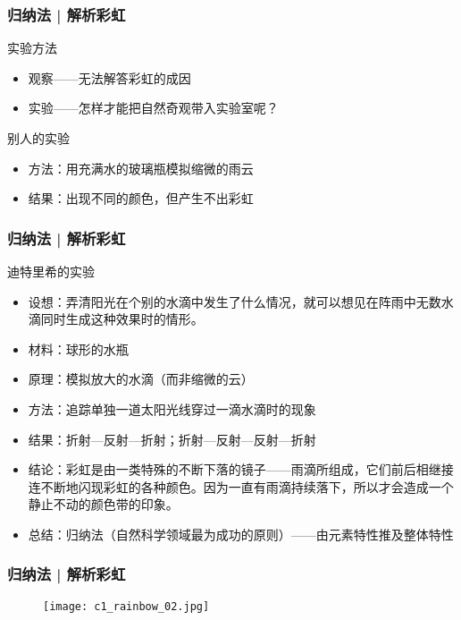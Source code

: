 \begin{frame}
  \frametitle{归纳法 | 解析彩虹}
  \begin{block}{实验方法}
    \begin{itemize}
      \item 观察——无法解答彩虹的成因
      \item 实验——怎样才能把自然奇观带入实验室呢？
    \end{itemize}
  \end{block}
  \pause
  \begin{block}{别人的实验}
    \begin{itemize}
      \item 方法：用充满水的玻璃瓶模拟缩微的雨云
      \item 结果：出现不同的颜色，但产生不出彩虹
    \end{itemize}
  \end{block}
\end{frame}

\begin{frame}
  \frametitle{归纳法 | 解析彩虹}
  \begin{block}{迪特里希的实验}
    \begin{itemize}
      \item 设想：弄清阳光在个别的水滴中发生了什么情况，就可以想见在阵雨中无数水滴同时生成这种效果时的情形。
      \item 材料：球形的水瓶
      \item 原理：模拟放大的水滴（而非缩微的云）
      \item 方法：追踪单独一道太阳光线穿过一滴水滴时的现象
      \item 结果：折射—反射—折射；折射—反射—反射—折射
      \item 结论：彩虹是由一类特殊的不断下落的镜子——雨滴所组成，它们前后相继接连不断地闪现彩虹的各种颜色。因为一直有雨滴持续落下，所以才会造成一个静止不动的颜色带的印象。
      \item 总结：\alert{归纳法}（自然科学领域最为成功的原则）——由元素特性推及整体特性
    \end{itemize}
  \end{block}
\end{frame}

\begin{frame}
  \frametitle{归纳法 | 解析彩虹}
  \begin{figure}
    \centering
    \texttt{[image: c1\_rainbow\_02.jpg]}
  \end{figure}
\end{frame}

